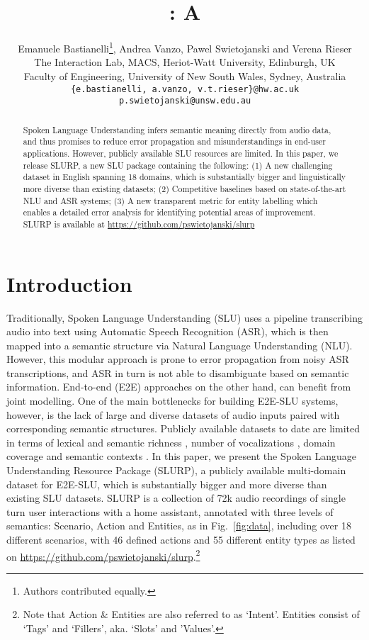 \documentclass[11pt,a4paper]{article}
\title{\datasetacr: A \datasetname}
\author{Emanuele Bastianelli\thanks{Authors contributed equally.}, 
  Andrea Vanzo, 
  Pawel Swietojanski and Verena Rieser \\
  The Interaction Lab, MACS, Heriot-Watt University, Edinburgh, UK \\
  Faculty of Engineering, University of New South Wales, Sydney, Australia \\
  {\tt \{e.bastianelli, a.vanzo, v.t.rieser\}@hw.ac.uk} \\
  {\tt p.swietojanski@unsw.edu.au} \\
  }
\date{}
\newcommand{\datasetacr}{SLURP}
\newcommand{\datasetname}{Spoken Language Understanding Resource Package}
\newcommand{\etoe}{E2E}
\newcommand{\slu}{SLU}
\newcommand{\asr}{ASR}
\newcommand{\nlu}{NLU}
\newcommand{\datasetwholek}{72k}
\newcommand{\scenarion}{18}
\newcommand{\actionn}{46}
\newcommand{\entityn}{55}
\begin{document}
\maketitle
\begin{abstract}
Spoken Language Understanding infers semantic meaning directly from audio data, and thus promises to reduce error propagation and misunderstandings in end-user applications. However, publicly available SLU resources are limited. In this paper, we release \datasetacr, a new SLU package  containing the following: (1) A new challenging dataset in English spanning \scenarion{} domains, which is substantially bigger and linguistically more diverse than existing datasets; (2) Competitive baselines based on state-of-the-art NLU and ASR systems; (3)  A new transparent metric for entity labelling which enables a detailed error analysis for identifying potential areas of improvement. \datasetacr{} is available at \url{https://github.com/pswietojanski/slurp}
\end{abstract}
\section{Introduction}


Traditionally, Spoken Language Understanding (\slu) 
uses a pipeline transcribing audio into text using Automatic Speech Recognition (\asr), which is then mapped
into a semantic structure via Natural Language Understanding (\nlu). 
However, this modular approach is prone to error propagation from noisy \asr{} transcriptions, and \asr{} in turn is not able to disambiguate based on semantic information. End-to-end (\etoe) approaches on the other hand, can benefit from joint modelling.
One of the main bottlenecks for building \etoe-\slu{} systems, however, is the lack of large and diverse datasets
of audio inputs paired with corresponding semantic structures. Publicly available datasets to date are limited in terms of lexical and semantic richness \cite{lugosh19:Interspeech}, number of vocalizations \cite{Coucke18:Snips}, domain coverage \cite{Hemphill90:ATIS, Dahl:94ATIS} and semantic contexts \cite{Godfrey92:switchboard, Jurafsky1997:DASwitchboard}. 
In this paper, we present the \datasetname{} (\datasetacr), a publicly available multi-domain dataset for \etoe-\slu{}, which is substantially bigger and more diverse than existing SLU datasets. \datasetacr{} is a collection of \texttildelow\datasetwholek{} audio recordings of single turn user interactions with a home assistant, annotated with three levels of semantics:  Scenario, Action and Entities, as in Fig.\ \ref{fig:data}, including over \scenarion{} different scenarios, with \actionn{} defined actions and \entityn{} different entity types as listed on \url{https://github.com/pswietojanski/slurp}.\footnote{Note that Action \& Entities are also referred to as `Intent'. Entities consist of `Tags' and  `Fillers', aka. `Slots' and 'Values'.}
\end{document}
